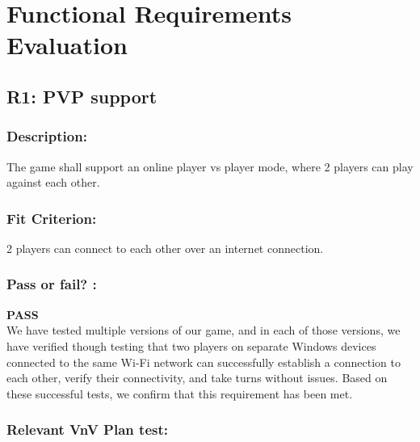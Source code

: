 \documentclass[12pt, titlepage]{article}
\begin{document}

\newpage

\tableofcontents

\listoftables %

\listoffigures %

\newpage



\section{Functional Requirements Evaluation}


\subsection{R1: PVP support}
\label{R1}

 \subsubsection*{Description:}  The game shall support an online player vs player mode, where 2 players can play against
each other.

 \subsubsection*{Fit Criterion:}  2 players can connect to each other over an internet connection.
 
 \subsubsection*{Pass or fail? :}
 
 \noindent \textbf{PASS}\\
 
 We have tested multiple versions of our game, and in each of those versions, we have verified though testing that two players on separate Windows devices connected to the same Wi-Fi network can successfully establish a connection to each other, verify their connectivity, and take turns without issues. Based on these successful tests, we confirm that this requirement has been met.
 
 \subsubsection*{Relevant VnV Plan test: }  
 
\end{document}

